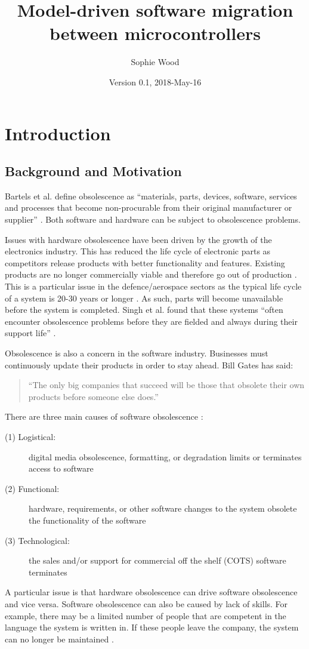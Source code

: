 \documentclass{UoYCSproject}
\author{Sophie Wood}
\title{Model-driven software migration between microcontrollers}
\date{Version 0.1, 2018-May-16}
\begin{document}
\maketitle
\listoffigures
\listoftables

\chapter{Introduction}
\section{Background and Motivation}

Bartels et al. define obsolescence as ``materials, parts, devices, software, services and processes that become non-procurable from their original manufacturer or supplier'' \parencite{bartels2012strategies}. Both software and hardware can be subject to obsolescence problems. 

Issues with hardware obsolescence have been driven by the growth of the electronics industry. This has reduced the life cycle of electronic parts as competitors release products with better functionality and features. Existing products are no longer commercially viable and therefore go out of production \parencite{bartels2012strategies}. This is a particular issue in the defence/aerospace sectors as the typical life cycle of a system is 20-30 years or longer \parencite{rojo2010obsolescence}. As such, parts will become unavailable before the system is completed. Singh et al. found that these systems ``often encounter obsolescence problems before they are fielded and always during their support life'' \parencite{singh2006obsolescence}.

Obsolescence is also a concern in the software industry. Businesses must continuously update their products in order to stay ahead. Bill Gates has said: 
\begin{quote}
``The only big companies that succeed will be those that obsolete their own products before someone else does.'' \parencite{bartels2012strategies}
\end{quote}
There are three main causes of software obsolescence \parencite{sandborn2007obsolescence}:
\begin{description}
\item[(1) Logistical:] digital media obsolescence, formatting, or degradation limits or terminates access to software
\item[(2) Functional:] hardware, requirements, or other software changes to the system obsolete the functionality of the software
\item[(3) Technological:]  the sales and/or support for commercial off the shelf (COTS) software terminates
\end{description}
A particular issue is that hardware obsolescence can drive software obsolescence and vice versa. Software obsolescence can also be caused by lack of skills. For example, there may be a limited number of people that are competent in the language the system is written in. If these people leave the company, the system can no longer be maintained \parencite{rajagopal2014software}. 
\end{document}
